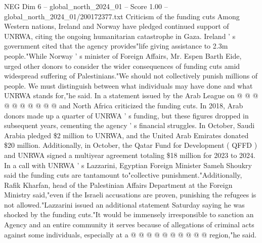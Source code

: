 \begin{textsample}{NEG Dim 6 – global\_north\_2024\_01 – Score 1.00 – global\_north\_2024\_01/200172377.txt}
Criticism of the funding cuts Among Western nations, Ireland and Norway have pledged continued support of UNRWA, citing the ongoing humanitarian catastrophe in Gaza.
Ireland ' s government cited that the agency provides"life giving assistance to 2.3m people."While Norway ' s minister of Foreign Affairs, Mr.
Espen Barth Eide, urged other donors to consider the wider consequences of funding cuts amid widespread suffering of Palestinians."We should not collectively punish millions of people.
We must distinguish between what individuals may have done and what UNRWA stands for,"he said.
In a statement issued by the Arab League on @ @ @ @ @ @ @ @ @ @ and North Africa criticized the funding cuts.
In 2018, Arab donors made up a quarter of UNRWA ' s funding, but these figures dropped in subsequent years, cementing the agency ' s financial struggles.
In October, Saudi Arabia pledged \$2 million to UNRWA, and the United Arab Emirates donated \$20 million.
Additionally, in October, the Qatar Fund for Development ( QFFD ) and UNRWA signed a multiyear agreement totaling \$18 million for 2023 to 2024.
In a call with UNRWA ' s Lazzarini, Egyptian Foreign Minister Sameh Shoukry said the funding cuts are tantamount to"collective punishment."Additionally, Rafik Kharfan, head of the Palestinian Affairs Department at the Foreign Ministry said,"even if the Israeli accusations are proven, punishing the refugees is not allowed."Lazzarini issued an additional statement Saturday saying he was shocked by the funding cuts."It would be immensely irresponsible to sanction an Agency and an entire community it serves because of allegations of criminal acts against some individuals, especially at a @ @ @ @ @ @ @ @ @ @ region,"he said.

\end{textsample}
